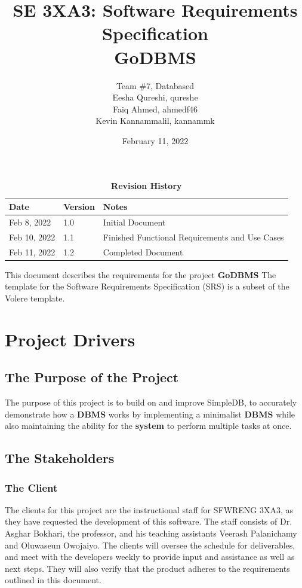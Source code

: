 \documentclass[12pt, titlepage]{article}
\title{SE 3XA3: Software Requirements Specification\\ GoDBMS}
\author{Team \#7, Databased
		\\ Eesha Qureshi, qureshe 
		\\ Faiq Ahmed, ahmedf46 
		\\ Kevin Kannammalil, kannammk
}
\date{February 11, 2022}
\begin{document}
\maketitle

\tableofcontents
\listoftables
\listoffigures

\begin{table}[h!]
\caption{\bf Revision History}
\begin{tabularx}{\textwidth}{p{3cm}p{2cm}X}
\toprule {\bf Date} & {\bf Version} & {\bf Notes}\\
\midrule
Feb 8, 2022 & 1.0 & Initial Document \\
Feb 10, 2022 & 1.1 & Finished Functional Requirements and Use Cases \\
Feb 11, 2022 & 1.2 & Completed Document \\
\bottomrule
\end{tabularx}
\end{table}

\newpage


\noindent This document describes the requirements for the project \textbf{GoDBMS} The template for the Software Requirements Specification (SRS) is a subset of the Volere template.

\section{Project Drivers}

\subsection{The Purpose of the Project}

The purpose of this project is to build on and improve SimpleDB, to accurately demonstrate how a \textbf{DBMS} works by implementing a minimalist \textbf{DBMS} while also maintaining the ability for the \textbf{system} to perform multiple tasks at once.

\subsection{The Stakeholders}

\subsubsection{The Client}
The clients for this project are the instructional staff for SFWRENG 3XA3, as they have requested the development of this software. The staff consists of Dr. Asghar Bokhari, the professor, and his teaching assistants Veerash Palanichamy and Oluwaseun Owojaiyo. The clients will oversee the schedule for deliverables, and meet with the developers weekly to provide input and assistance as well as next steps. They will also verify that the product adheres to the requirements outlined in this document.
\end{document}
